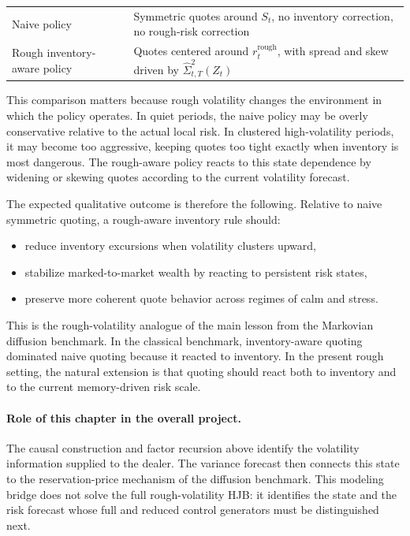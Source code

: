 \begin{center}
\begin{tabularx}{\textwidth}{@{}lX@{}}
\toprule
Naive policy & Symmetric quotes around \(S_t\), no inventory correction, no rough-risk correction \\
Rough inventory-aware policy & Quotes centered around \(r_t^{\mathrm{rough}}\), with spread and skew driven by \(\widehat{\Sigma}_{t,T}^2(Z_t)\) \\
\bottomrule
\end{tabularx}
\end{center}

This comparison matters because rough volatility changes the environment in which the policy operates. In quiet periods, the naive policy may be overly conservative relative to the actual local risk. In clustered high-volatility periods, it may become too aggressive, keeping quotes too tight exactly when inventory is most dangerous. The rough-aware policy reacts to this state dependence by widening or skewing quotes according to the current volatility forecast.

The expected qualitative outcome is therefore the following. Relative to naive symmetric quoting, a rough-aware inventory rule should:
\begin{itemize}
    \item reduce inventory excursions when volatility clusters upward,
    \item stabilize marked-to-market wealth by reacting to persistent risk states,
    \item preserve more coherent quote behavior across regimes of calm and stress.
\end{itemize}
This is the rough-volatility analogue of the main lesson from the Markovian diffusion benchmark. In the classical benchmark, inventory-aware quoting dominated naive quoting because it reacted to inventory. In the present rough setting, the natural extension is that quoting should react both to inventory and to the current memory-driven risk scale.

\paragraph{Role of this chapter in the overall project.}

The causal construction and factor recursion above identify the volatility information supplied to the dealer. The variance forecast then connects this state to the reservation-price mechanism of the diffusion benchmark. This modeling bridge does not solve the full rough-volatility HJB: it identifies the state and the risk forecast whose full and reduced control generators must be distinguished next.

